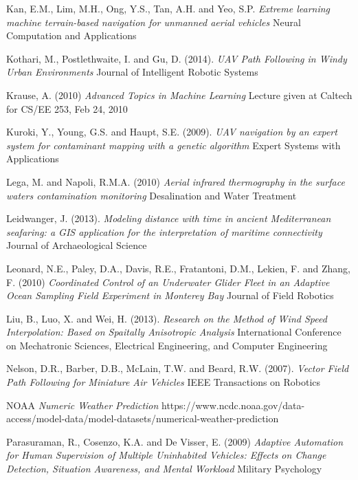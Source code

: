 \documentclass[12pt]{report}
\begin{document}
\begin{thebibliography}{10}
	Kan, E.M., Lim, M.H., Ong, Y.S., Tan, A.H. and Yeo, S.P. \emph{Extreme learning machine terrain-based navigation for unmanned aerial vehicles} Neural Computation and Applications

	Kothari, M., Postlethwaite, I. and Gu, D. (2014). \emph{UAV Path Following in Windy Urban Environments} Journal of Intelligent Robotic Systems

	Krause, A. (2010) \emph{Advanced Topics in Machine Learning} Lecture given at Caltech for CS/EE 253, Feb 24, 2010

	Kuroki, Y., Young, G.S. and Haupt, S.E. (2009). \emph{UAV navigation by an expert system for contaminant mapping with a genetic algorithm} Expert Systems with Applications

	Lega, M. and Napoli, R.M.A. (2010) \emph{Aerial infrared thermography in the surface waters contamination monitoring} Desalination and Water Treatment

	Leidwanger, J. (2013). \emph{Modeling distance with time in ancient Mediterranean seafaring: a GIS application for the interpretation of maritime connectivity} Journal of Archaeological Science

	Leonard, N.E., Paley, D.A., Davis, R.E., Fratantoni, D.M., Lekien, F. and Zhang, F. (2010) \emph{Coordinated Control of an Underwater Glider Fleet in an Adaptive Ocean Sampling Field Experiment in Monterey Bay} Journal of Field Robotics
	 
	Liu, B., Luo, X. and Wei, H. (2013). \emph{Research on the Method of Wind Speed Interpolation: Based on Spaitally Anisotropic Analysis} International Conference on Mechatronic Sciences, Electrical Engineering, and Computer Engineering

	Nelson, D.R., Barber, D.B., McLain, T.W. and Beard, R.W. (2007). \emph{Vector Field Path Following for Miniature Air Vehicles} IEEE Transactions on Robotics

	NOAA \emph{Numeric Weather Prediction} https://www.ncdc.noaa.gov/data-access/model-data/model-datasets/numerical-weather-prediction

	Parasuraman, R., Cosenzo, K.A. and De Visser, E. (2009) \emph{Adaptive Automation for Human Supervision of Multiple Uninhabited Vehicles: Effects on Change Detection, Situation Awareness, and Mental Workload} Military Psychology


\end{thebibliography}
\end{document}

